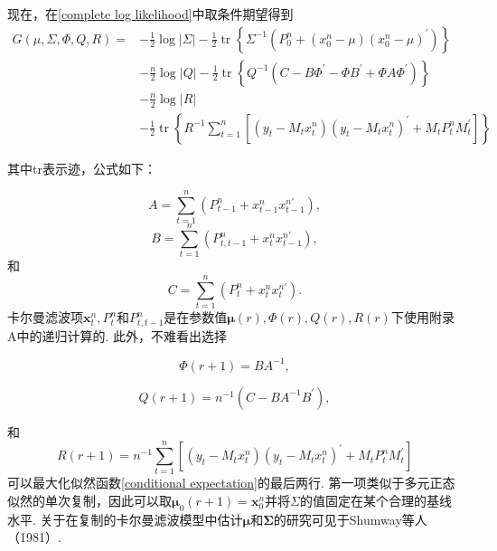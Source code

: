 \documentclass[UTF8,12pt]{ctexart}
\numberwithin{equation}{section}%
\begin{document}
	现在，在\eqref{complete log likelihood}中取条件期望得到
	\begin{equation}\label{conditional expectation}
		\begin{aligned}
			G(\mu, \Sigma, \Phi, Q, R)= & -\frac{1}{2} \log |\Sigma|-\frac{1}{2} \operatorname{tr}\left\{\Sigma^{-1}\left(P_0^n+\left(x_0^n-\mu\right)\left(x_0^n-\mu\right)^{\prime}\right)\right\} \\
			& -\frac{n}{2} \log |Q|-\frac{1}{2} \operatorname{tr}\left\{Q^{-1}\left(C-B \Phi^{\prime}-\Phi B^{\prime}+\Phi A \Phi^{\prime}\right)\right\} \\
			& -\frac{n}{2} \log |R| \\
			& -\frac{1}{2} \operatorname{tr}\left\{R^{-1} \sum_{t=1}^n\left[\left(y_t-M_t x_t^n\right)\left(y_t-M_t x_t^n\right)^{\prime}+M_t P_t^n M_t^{\prime}\right]\right\}
		\end{aligned}
	\end{equation}

	其中tr表示迹，公式如下：
	
	\begin{equation}\label{A}
		 A=\sum_{t=1}^n\left(P_{t-1}^n+x_{t-1}^n x_{t-1}^{n \prime}\right),
	\end{equation}
	\begin{equation}\label{B}
		B=\sum_{t=1}^n\left(P_{t, t-1}^n+x_t^n x_{t-1}^{n \prime}\right),
	\end{equation}
	和
	\begin{equation}\label{C}
	C=\sum_{t=1}^n\left(P_t^n+x_t^n x_t^{n \prime}\right) .
	\end{equation}
	卡尔曼滤波项$\boldsymbol{x}_t^n, P_t^n$和$P_{t, t-1}^n$是在参数值$\boldsymbol{\mu}(r), \Phi(r), Q(r), R(r)$下使用附录A中的递归计算的. 此外，不难看出选择
	
	\begin{equation}\label{Phi}
		\Phi(r+1)=B A^{-1},
	\end{equation}
	
	\begin{equation}\label{Q}
		Q(r+1)=n^{-1}\left(C-B A^{-1} B^{\prime}\right),
	\end{equation}

	和
	$$
	R(r+1)=n^{-1} \sum_{t=1}^n\left[\left(y_t-M_t x_t^n\right)\left(y_t-M_t x_t^n\right)^{\prime}+M_t P_t^n M_t^{\prime}\right]
	$$
	可以最大化似然函数\eqref{conditional expectation}的最后两行. 第一项类似于多元正态似然的单次复制，因此可以取$\boldsymbol{\mu}_0(r+1)=\boldsymbol{x}_0^n$并将$\Sigma$的值固定在某个合理的基线水平. 关于在复制的卡尔曼滤波模型中估计$\boldsymbol{\mu}$和$\boldsymbol{\Sigma}$的研究可见于Shumway等人（1981）.
	
\end{document}
